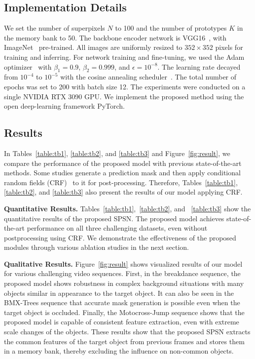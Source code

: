 \documentclass[10pt,twocolumn,letterpaper]{article}
\begin{document}
\subsection{Implementation Details}
We set the number of superpixels $N$ to 100 and the number of prototypes $K$ in the memory bank to 50. The backbone encoder network is VGG16~\cite{simonyan2014very}, with ImageNet~\cite{deng2009imagenet} pre-trained. All images are uniformly resized to $352 \times 352$ pixels for training and inferring. For network training and fine-tuning, we used the Adam optimizer~\cite{kingma2014adam} with $\beta_1 = 0.9$, $\beta_2 = 0.999$, and $\epsilon = 10^{-8}$. The learning rate decayed from $10^{-4}$ to $10^{-5}$ with the cosine annealing scheduler~\cite{loshchilov2016sgdr}. The total number of epochs was set to 200 with batch size 12. The experiments were conducted on a single NVIDIA RTX 3090 GPU. We implement the proposed method using the open deep-learning framework PyTorch.

\subsection{Results}
In Tables~\ref{table:tb1}, \ref{table:tb2}, and \ref{table:tb3} and Figure~\ref{fig:result}, we compare the performance of the proposed model with previous state-of-the-art methods. Some studies generate a prediction mask and then apply conditional random fields (CRF)~\cite{lafferty2001conditional} to it for post-processing. Therefore, Tables~\ref{table:tb1}, \ref{table:tb2}, and \ref{table:tb3} also present the results of our model applying CRF.

\noindent
\textbf{Quantitative Results.} 
Tables~\ref{table:tb1},~\ref{table:tb2}, and ~\ref{table:tb3} show the quantitative results of the proposed SPSN. The proposed model achieves state-of-the-art performance on all three challenging datasets, even without postprocessing using CRF. We demonstrate the effectiveness of the proposed modules through various ablation studies in the next section.


\noindent
\textbf{Qualitative Results.} Figure~\ref{fig:result} shows visualized results of our model for various challenging video sequences. First, in the breakdance sequence, the proposed model shows robustness in complex background situations with many objects similar in appearance to the target object. It can also be seen in the BMX-Trees sequence that accurate mask generation is possible even when the target object is occluded. Finally, the Motocross-Jump sequence shows that the proposed model is capable of consistent feature extraction, even with extreme scale changes of the objects. These results show that the proposed SPSN extracts the common features of the target object from previous frames and stores them in a memory bank, thereby excluding the influence on non-common objects.
\end{document}
